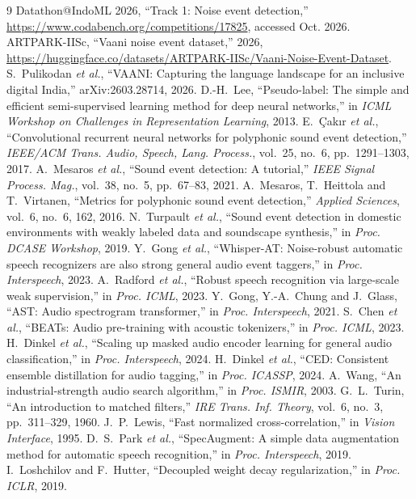 \documentclass[conference]{IEEEtran}
\begin{document}
\begin{thebibliography}{9}
 Datathon@IndoML 2026, ``Track 1: Noise event detection,''
\url{https://www.codabench.org/competitions/17825}, accessed Oct. 2026.
 ARTPARK-IISc, ``Vaani noise event dataset,'' 2026,
\url{https://huggingface.co/datasets/ARTPARK-IISc/Vaani-Noise-Event-Dataset}.
 S.~Pulikodan \emph{et al.}, ``VAANI: Capturing the language landscape for an inclusive digital
India,'' arXiv:2603.28714, 2026.
 D.-H.~Lee, ``Pseudo-label: The simple and efficient semi-supervised learning method for deep neural
networks,'' in \emph{ICML Workshop on Challenges in Representation Learning}, 2013.
 E.~\c{C}ak{\i}r \emph{et al.}, ``Convolutional recurrent neural networks for polyphonic sound event
detection,'' \emph{IEEE/ACM Trans. Audio, Speech, Lang. Process.}, vol.~25, no.~6, pp.~1291--1303, 2017.
 A.~Mesaros \emph{et al.}, ``Sound event detection: A tutorial,'' \emph{IEEE Signal Process.
Mag.}, vol.~38, no.~5, pp.~67--83, 2021.
 A.~Mesaros, T.~Heittola and T.~Virtanen, ``Metrics for polyphonic sound event detection,''
\emph{Applied Sciences}, vol.~6, no.~6, 162, 2016.
 N.~Turpault \emph{et al.}, ``Sound event detection in domestic environments with weakly labeled
data and soundscape synthesis,'' in \emph{Proc. DCASE Workshop}, 2019.
 Y.~Gong \emph{et al.}, ``Whisper-AT: Noise-robust automatic speech recognizers are also strong
general audio event taggers,'' in \emph{Proc. Interspeech}, 2023.
 A.~Radford \emph{et al.}, ``Robust speech recognition via large-scale weak supervision,'' in
\emph{Proc. ICML}, 2023.
 Y.~Gong, Y.-A.~Chung and J.~Glass, ``AST: Audio spectrogram transformer,'' in \emph{Proc. Interspeech},
2021.
 S.~Chen \emph{et al.}, ``BEATs: Audio pre-training with acoustic tokenizers,'' in \emph{Proc. ICML},
2023.
 H.~Dinkel \emph{et al.}, ``Scaling up masked audio encoder learning for general audio
classification,'' in \emph{Proc. Interspeech}, 2024.
 H.~Dinkel \emph{et al.}, ``CED: Consistent ensemble distillation for audio tagging,'' in \emph{Proc.
ICASSP}, 2024.
 A.~Wang, ``An industrial-strength audio search algorithm,'' in \emph{Proc. ISMIR}, 2003.
 G.~L.~Turin, ``An introduction to matched filters,'' \emph{IRE Trans. Inf. Theory}, vol.~6, no.~3,
pp.~311--329, 1960.
 J.~P.~Lewis, ``Fast normalized cross-correlation,'' in \emph{Vision Interface}, 1995.
 D.~S.~Park \emph{et al.}, ``SpecAugment: A simple data augmentation method for automatic speech
recognition,'' in \emph{Proc. Interspeech}, 2019.
 I.~Loshchilov and F.~Hutter, ``Decoupled weight decay regularization,'' in \emph{Proc. ICLR}, 2019.
\end{thebibliography}
\end{document}
